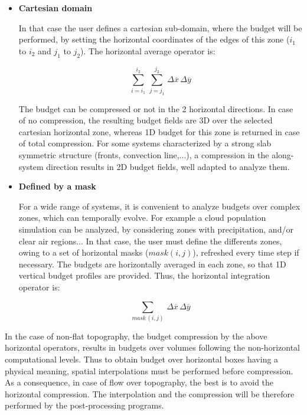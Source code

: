 \begin{itemize}
\item {\bf Cartesian domain}

 In that case the user defines a cartesian sub-domain, where the budget will be
performed, by setting the horizontal coordinates of the edges of this zone
($i_1$ to $i_2$ and $j_1$ to $j_2$). The horizontal average operator is:

\begin{equation}
\sum_{i=i_1}^{i_2} \, \sum_{j=j_1}^{j_2}
\, \Delta \overline{x} \, \Delta \overline{y}
\end{equation}


\noindent
The budget can be compressed or not in the 2 horizontal directions.
In case of no compression, the resulting budget fields are 3D over the selected
cartesian horizontal zone, whereas 1D budget for this zone is returned in case of total
compression. For some systems characterized by a strong slab symmetric structure
(fronts, convection line,...), a compression in the along-system direction
results in 2D budget fields, well adapted to analyze them.

\item {\bf Defined by a mask}

 For a wide range of systems, it is convenient to analyze budgets over
complex zones, which can temporally evolve. For example a cloud population
simulation can be analyzed, by considering zones with precipitation, and/or
clear air regions... In that case, the user must define the differents zones,
owing to a set of horizontal masks ($mask(i,j)$), refreshed every time
step if necessary. The budgets are horizontally averaged in each zone, so that
1D vertical budget profiles are provided. Thus, the horizontal integration operator is:

\begin{equation}
\sum_{mask \, (i,j)} \, \Delta \overline{x} \, \Delta \overline{y}
\end{equation}

\end{itemize}

 In the case of non-flat topography, the budget compression
by the above horizontal operators, results in budgets over volumes following
the non-horizontal computational levels. Thus to obtain budget over horizontal
boxes having a physical meaning, spatial interpolations must be performed
before compression. As a consequence, in case of flow over topography, the
best is to avoid the horizontal compression. The interpolation and the compression
will be therefore performed by the post-processing programs.

